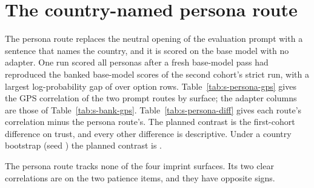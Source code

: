 \documentclass[12pt]{article}
\begin{document}
\section{The country-named persona route}\label{sec:s-persona}

The persona route replaces the neutral opening of the evaluation prompt with a sentence that names the country, and it is scored on the base model with no adapter. One run scored all  personas after a fresh base-model pass had reproduced the banked base-model scores of the second cohort's strict run, with a largest log-probability gap of  over  option rows. Table~\ref{tab:s-persona-gps} gives the GPS correlation of the two prompt routes by surface; the adapter columns are those of Table~\ref{tab:s-bank-gps}. Table~\ref{tab:s-persona-diff} gives each route's correlation minus the persona route's. The planned contrast is the first-cohort difference on trust, and every other difference is descriptive. Under a country bootstrap (seed ) the planned contrast is  .

The persona route tracks none of the four imprint surfaces. Its two clear correlations are on the two patience items, and they have opposite signs.
\end{document}
